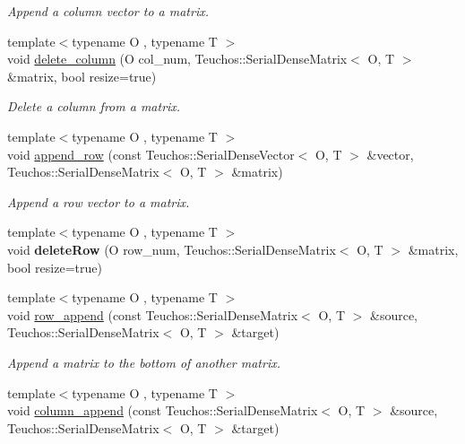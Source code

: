 \begin{DoxyCompactItemize}
\begin{DoxyCompactList}\small\item\em Append a column vector to a matrix. \end{DoxyCompactList}\item 
{\footnotesize template$<$typename O , typename T $>$ }\\void \hyperlink{LinearAlgebra_8hpp_a20254ff5746b5e521cee512b39a956ca}{delete\+\_\+column} (O col\+\_\+num, Teuchos\+::\+Serial\+Dense\+Matrix$<$ O, T $>$ \&matrix, bool resize=true)\label{LinearAlgebra_8hpp_a20254ff5746b5e521cee512b39a956ca}

\begin{DoxyCompactList}\small\item\em Delete a column from a matrix. \end{DoxyCompactList}\item 
{\footnotesize template$<$typename O , typename T $>$ }\\void \hyperlink{LinearAlgebra_8hpp_af169a054397da6f58a926b9f19db2e0f}{append\+\_\+row} (const Teuchos\+::\+Serial\+Dense\+Vector$<$ O, T $>$ \&vector, Teuchos\+::\+Serial\+Dense\+Matrix$<$ O, T $>$ \&matrix)\label{LinearAlgebra_8hpp_af169a054397da6f58a926b9f19db2e0f}

\begin{DoxyCompactList}\small\item\em Append a row vector to a matrix. \end{DoxyCompactList}\item 
{\footnotesize template$<$typename O , typename T $>$ }\\void {\bfseries delete\+Row} (O row\+\_\+num, Teuchos\+::\+Serial\+Dense\+Matrix$<$ O, T $>$ \&matrix, bool resize=true)\label{LinearAlgebra_8hpp_a8030de80dbcc7033d36f3821109ebc51}

\item 
{\footnotesize template$<$typename O , typename T $>$ }\\void \hyperlink{LinearAlgebra_8hpp_a38f83d2d214e8794e43395bfcced75c8}{row\+\_\+append} (const Teuchos\+::\+Serial\+Dense\+Matrix$<$ O, T $>$ \&source, Teuchos\+::\+Serial\+Dense\+Matrix$<$ O, T $>$ \&target)\label{LinearAlgebra_8hpp_a38f83d2d214e8794e43395bfcced75c8}

\begin{DoxyCompactList}\small\item\em Append a matrix to the bottom of another matrix. \end{DoxyCompactList}\item 
{\footnotesize template$<$typename O , typename T $>$ }\\void \hyperlink{LinearAlgebra_8hpp_a69a30a39ec8dc3c76ece8059991149ed}{column\+\_\+append} (const Teuchos\+::\+Serial\+Dense\+Matrix$<$ O, T $>$ \&source, Teuchos\+::\+Serial\+Dense\+Matrix$<$ O, T $>$ \&target)\label{LinearAlgebra_8hpp_a69a30a39ec8dc3c76ece8059991149ed}


\end{DoxyCompactItemize}

